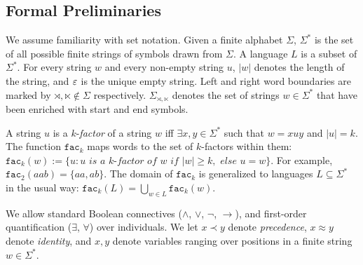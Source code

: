 \documentclass[11pt,a4paper]{article}
\newcommand{\facn}[1]{\ensuremath{\texttt{fac}_{#1}}}
\begin{document}
\subsection{Formal Preliminaries}

We assume familiarity with set notation.
Given a finite alphabet $\Sigma$, $\Sigma^*$ is the set of all possible finite strings of symbols drawn from $\Sigma$.
A language $L$ is a subset of $\Sigma^*$.
For every string $w$ and every non-empty string $u$, $|w|$ denotes the length of the string, and $\varepsilon$ is the unique empty string.
Left and right word boundaries are marked by  $\rtimes, \ltimes \notin \Sigma$ respectively.
 $\Sigma_{\rtimes, \ltimes }$ denotes the set of strings $w \in \Sigma^*$ that have been enriched with start and end symbols.


A string $u$ is a $k$-\emph{factor} of a string $w$ iff $\exists x, y \in \Sigma^*$ such that $w=xuy$ and $|u| = k$. 
The function $\facn{k}$ maps words to the set of $k$-factors within them: $\facn{k}(w) := \{ u : u \textit{ is a $k$-factor of } w \textit{ if } |w| \geq k, \textit{ else } u = w\}$.
For example, $\facn{2}(aab) = \{ aa, ab\}$.
%
The domain of $\facn{k}$ is generalized to languages $L \subseteq \Sigma^*$ in the usual way: $\facn{k}(L) = \bigcup_{w \in L} \facn{k}(w)$.

We allow standard Boolean connectives ($\wedge$, $\vee$, $\neg$, $\rightarrow $), and first-order quantification ($\exists$, $\forall $) over individuals. 
We let $x \prec y$ denote \emph{precedence}, $x \approx y$ denote \emph{identity}, and $x, y$ denote variables ranging over positions in a finite string $w \in \Sigma^*$. 
\end{document}
